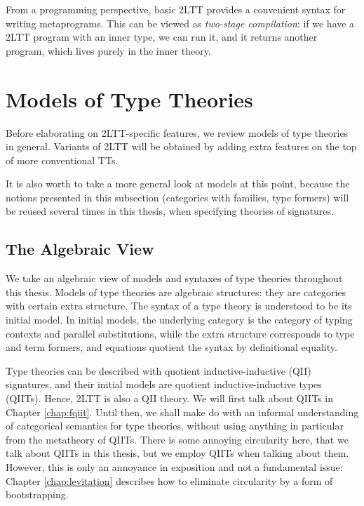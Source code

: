 \documentclass[12pt,a4paper,twoside,openany]{book}
\theoremstyle{remark}
\theoremstyle{definition}
\begin{document}
From a programming perspective, basic 2LTT provides a convenient syntax for
writing metaprograms. This can be viewed as \emph{two-stage compilation}: if we
have a 2LTT program with an inner type, we can run it, and it returns another
program, which lives purely in the inner theory.

\section{Models of Type Theories}
\label{sec:models-of-tts}

Before elaborating on 2LTT-specific features, we review models of type theories
in general. Variants of 2LTT will be obtained by adding extra features on the
top of more conventional TTs.

It is also worth to take a more general look at models at this point, because
the notions presented in this subsection (categories with families, type
formers) will be reused several times in this thesis, when specifying theories
of signatures.

\subsection{The Algebraic View}

We take an algebraic view \cite{TODO} of models and syntaxes of type theories throughout
this thesis. Models of type theories are algebraic structures: they are
categories with certain extra structure. The syntax of a type theory is
understood to be its initial model. In initial models, the underlying category
is the category of typing contexts and parallel substitutions, while the extra
structure corresponds to type and term formers, and equations quotient the
syntax by definitional equality.

Type theories can be described with quotient inductive-inductive (QII)
signatures, and their initial models are quotient inductive-inductive types
(QIITs). Hence, 2LTT is also a QII theory. We will first talk about QIITs in
Chapter \ref{chap:fqiit}. Until then, we shall make do with an informal
understanding of categorical semantics for type theories, without using anything
in particular from the metatheory of QIITs. There is some annoying circularity
here, that we talk about QIITs in this thesis, but we employ QIITs when talking
about them. However, this is only an annoyance in exposition and not a
fundamental issue: Chapter \ref{chap:levitation} describes how to eliminate
circularity by a form of bootstrapping.
\end{document}
